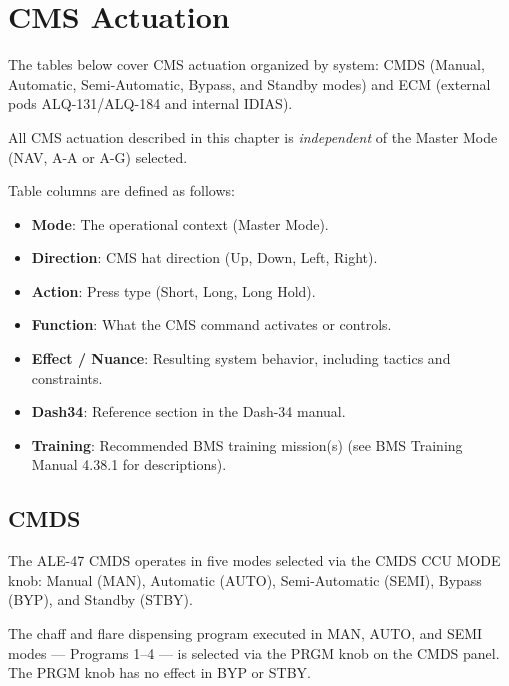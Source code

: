\documentclass[11pt, a4paper, twoside]{report}
\newcommand{\trnman}{BMS Training Manual 4.38.1}
\begin{document}
\section{CMS Actuation}
\label{sec:C5-S2}

The tables below cover CMS actuation organized by system: CMDS (Manual, Automatic, Semi-Automatic, Bypass, and Standby modes) and ECM (external pods ALQ-131/ALQ-184 and internal IDIAS).

All CMS actuation described in this chapter is \textit{independent} of the Master Mode (NAV, A-A or A-G) selected.

Table columns are defined as follows:

\begin{itemize}
  \item \textbf{Mode}: The operational context (Master Mode).
  \item \textbf{Direction}: CMS hat direction (Up, Down, Left, Right).
  \item \textbf{Action}: Press type (Short, Long, Long Hold).
  \item \textbf{Function}: What the CMS command activates or controls.
  \item \textbf{Effect / Nuance}: Resulting system behavior, including tactics and constraints.
  \item \textbf{Dash34}: Reference section in the Dash-34 manual.
  \item \textbf{Training}: Recommended BMS training mission(s) (see \trnman{} for descriptions).
\end{itemize}

\subsection{CMDS}
\label{sec:C5-S2-S1}

The ALE-47 CMDS operates in five modes selected via the CMDS CCU MODE knob: Manual (MAN), Automatic (AUTO), Semi-Automatic (SEMI), Bypass (BYP), and Standby (STBY).

The chaff and flare dispensing program executed in MAN, AUTO, and SEMI modes --- Programs 1--4 --- is selected via the PRGM knob on the CMDS panel. The PRGM knob has no effect in BYP or STBY.
\end{document}
